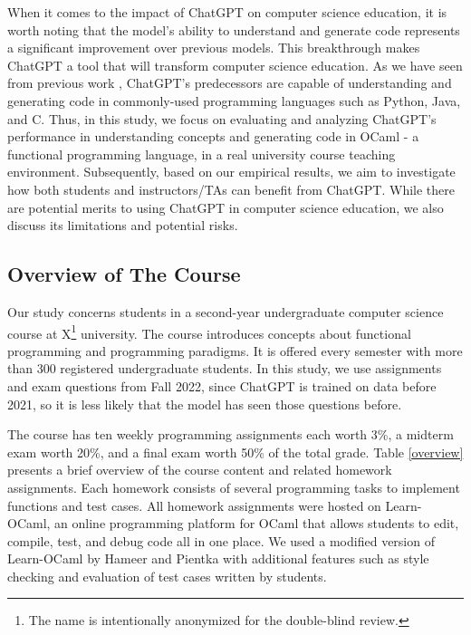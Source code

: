 \documentclass[sigconf,authordraft]{acmart}
\begin{document}
When it comes to the impact of ChatGPT on computer science education, it is worth noting that the model's ability to understand and generate code represents a significant improvement over previous models. This breakthrough makes ChatGPT a tool that will transform computer science education.
As we have seen from previous work \cite{chen2021codex}, ChatGPT's predecessors
are capable of understanding and generating code in commonly-used programming languages such as Python, Java, and C. Thus, in this study, we focus on evaluating and analyzing ChatGPT's performance in understanding concepts and generating code in OCaml - a functional programming language, in a real university course teaching environment. Subsequently, based on our empirical results, we aim to investigate how both students and instructors/TAs can benefit from ChatGPT. While there are potential merits to using ChatGPT in computer science education, we also discuss its limitations and potential risks.


\subsection{Overview of The Course}
Our study concerns students in a second-year undergraduate computer science course at X\footnote{The name is intentionally anonymized for the double-blind review.} university. The course introduces concepts about functional programming and programming paradigms. It is offered every semester with more than 300 registered undergraduate students. In this study, we use assignments and exam questions from Fall 2022, since ChatGPT is trained on data before 2021, so it is less likely that the model has seen those questions before.

The course has ten weekly programming assignments each worth 3\%, a midterm exam worth 20\%, and a final exam worth 50\%   of the total grade. Table \ref{overview} presents a brief overview of the course content and related homework assignments. Each homework consists of several programming tasks to implement functions and test cases. All homework assignments were hosted on Learn-OCaml, an online programming platform for OCaml that allows students to edit, compile, test, and debug code all in one place. We used a modified version of Learn-OCaml \cite{10.1145/3341719} by Hameer and Pientka with additional features such as style checking and evaluation of test cases written by students.
\end{document}
